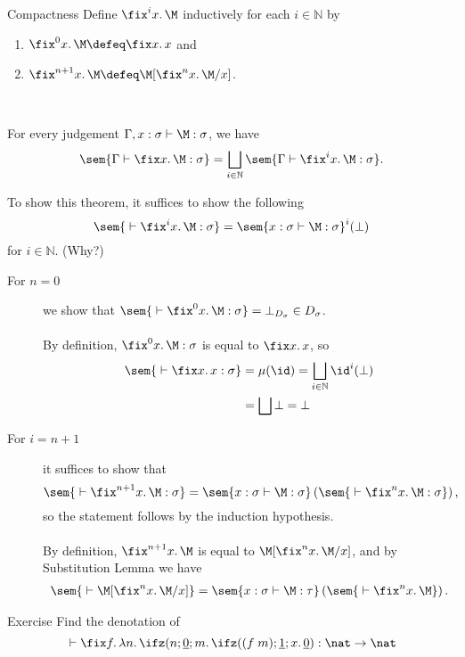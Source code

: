 \begin{frame}{Compactness}
  Define $\fix^i x.\, \M$ inductively for each $i \in \mathbb{N}$ by
  \begin{enumerate}
    \item $\fix^0 x.\, \M \defeq \fix x.\, x$ and
    \item $\fix^{n + 1} x.\, \M \defeq
      \M[\fix^n x.\, \M/ x]$. 
  \end{enumerate}
  ~\\
  \begin{theorem}
    For every judgement $\Gamma, x : \sigma \vdash \M : \sigma$, we have
    \[
      \sem{\Gamma \vdash \fix x.\, \M : \sigma}
      = \bigsqcup_{i \in \mathbb{N}} \sem{\Gamma \vdash \fix^i x.\, \M :
        \sigma}.
    \]
  \end{theorem}
  To show this theorem, it suffices to show the following 
  \[
    \sem{{}\vdash \fix^i x.\,\M : \sigma}
    = \sem{x : \sigma \vdash \M : \sigma}^i(\bot)
  \]
  for $i \in \mathbb{N}$. (Why?)
\end{frame}

\begin{frame}
  \begin{description}
    \item[For $n = 0$] we show that $\sem{{}\vdash \fix^0 x.\,\M : \sigma} =
      \bot_{D_\sigma} \in D_\sigma$.
      \\~\\

      By definition, $\fix^0 x.\, \M : \sigma$ is equal to
     $\fix x.\, x$, so  
      \begin{align*}
        \sem{{}\vdash \fix x .\, x : \sigma} & = \mu(\id) = \bigsqcup_{i \in
          \mathbb{N}}  \id^i(\bot) \\
        &= \bigsqcup \bot = \bot
      \end{align*}
    \item[For $i = n+1$] it suffices to show that
      \[
        \sem{{}\vdash \fix^{n+1} x.\,\M : \sigma} = \sem{x : \sigma \vdash \M :
          \sigma} \left(\sem{{}\vdash \fix^n x.\,\M:\sigma}\right),
      \] so the statement follows by the induction hypothesis.
      \\~\\

      By definition, $\fix^{n+1} x.\,\M$ is equal to
      $\M[\fix^n x.\,\M/x]$, and by Substitution Lemma we have
      \begin{align*}
        \sem{{}\vdash \M[\fix^n x.\,\M/x]}
        = \sem{x : \sigma \vdash \M : \tau} \left(
          \sem{{}\vdash \fix^n x.\, \M} \right).
      \end{align*}
  \end{description}
\end{frame}


\begin{frame}
  \begin{block}{Exercise}
    Find the denotation of
    \[
      {}\vdash \fix f.\,\lambda n.\,\ifz(n; \underline{0};
      m.\, \ifz((f\; m); \underline{1}; x.\,\underline{0}) : \nat\to\nat
    \]
  \end{block}
\end{frame}



